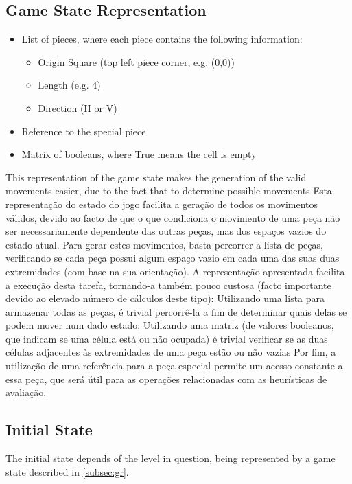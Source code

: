 \documentclass[conference]{IEEEtran}
\begin{document}
\subsection{Game State Representation} \label{subsec:gr}

\begin{itemize}
        \item List of pieces, where each piece contains the following information:
    \begin{itemize}
        \item Origin Square (top left piece corner, e.g. (0,0))
        \item Length (e.g. 4)
        \item Direction (H or V)
    \end{itemize}
    \item Reference to the special piece
    \item Matrix of booleans, where True means the cell is empty
\end{itemize}

This representation of the game state makes the generation of the valid movements easier, due to the fact that to determine possible movements 
Esta representação do estado do jogo facilita a geração de todos os movimentos válidos, devido ao facto de que o que condiciona o movimento de uma peça não ser necessariamente dependente das outras peças, mas dos espaços vazios do estado atual. Para gerar estes movimentos, basta percorrer a lista de peças, verificando se cada peça possui algum espaço vazio em cada uma das suas duas extremidades (com base na sua orientação). A representação apresentada facilita a execução desta tarefa, tornando-a também pouco custosa (facto importante devido ao elevado número de cálculos deste tipo):
Utilizando uma lista para armazenar todas as peças, é trivial percorrê-la a fim de determinar quais delas se podem mover num dado estado;
Utilizando uma matriz (de valores booleanos, que indicam se uma célula está ou não ocupada) é trivial verificar se as duas células adjacentes às extremidades de uma peça estão ou não vazias
Por fim, a utilização de uma referência para a peça especial permite um acesso constante a essa peça, que será útil para as operações relacionadas com as heurísticas de avaliação.

\subsection{Initial State}
The initial state depends of the level in question, being represented by a game state described in \autoref{subsec:gr}.
\end{document}
